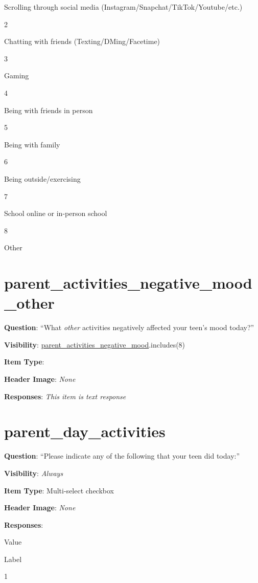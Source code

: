 \documentclass[]{book}
\begin{document}
Scrolling through social media (Instagram/Snapchat/TikTok/Youtube/etc.)

2

Chatting with friends (Texting/DMing/Facetime)

3

Gaming

4

Being with friends in person

5

Being with family

6

Being outside/exercising

7

School online or in-person school

8

Other

\hypertarget{parent_activities_negative_mood_other}{%
\section{parent\_activities\_negative\_mood\_other}\label{parent_activities_negative_mood_other}}

\textbf{Question}: ``What \emph{other} activities negatively affected your teen's mood today?''

\textbf{Visibility}: \protect\hyperlink{parent_activities_negative_mood}{parent\_activities\_negative\_mood}.includes(8)

\textbf{Item Type}:

\textbf{Header Image}: \emph{None}

\textbf{Responses}: \emph{This item is text response}

\hypertarget{parent_day_activities}{%
\section{parent\_day\_activities}\label{parent_day_activities}}

\textbf{Question}: ``Please indicate any of the following that your teen did today:''

\textbf{Visibility}: \emph{Always}

\textbf{Item Type}: Multi-select checkbox

\textbf{Header Image}: \emph{None}

\textbf{Responses}:

Value

Label

1
\end{document}
